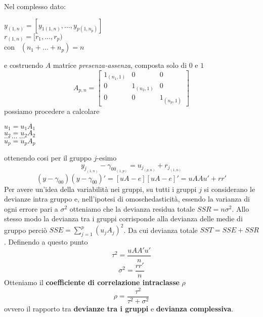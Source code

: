 \documentclass[a4page, 11pt]{article} %
\begin{document}
Nel complesso dato:
\begin{center}
$y_{(1,n)} = [y_{1(1,n)},\dots,y_{p(1,n_p)}]$ \\
$r_{(1,n)}=[r_1,\dots,r_p)$ \\
con \  $(n_1+\dots+n_p) = n$
\end{center}
e costruendo $A$ matrice \textit{presenza-assenza}, composta solo di $0$ e $1$
\[A_{p,n}=
\begin{bmatrix}
1_{(n_{1},1)} & 0&0 \\
0&1_{(n_{2},1)}&0 \\
0&0&1_{(n_{p},1)}
\end{bmatrix}
\]
possiamo procedere a calcolare
\begin{center}
$u_1= u_1 A_1$ \\
$u_2 = u_2 A_2$ \\
$\dots \ \dots \ \dots$ \\
$u_p = u_p A_p$
\end{center}
ottenendo cosi per il gruppo $j$-esimo
\begin{equation*}
y_{j_{(1,n)}} -\gamma_{00_{(1,p)}} = u_{j_{(p,n)}} + r_{j_{(1,n)}}
\end{equation*}
\begin{equation*}
(y-\gamma_{00})(y-\gamma_{00})' = [uA-e][uA-e]' = uAAu'+rr'
\end{equation*}
Per avere un'idea della variabilità nei gruppi, su tutti i gruppi $j$ si considerano le devianze intra gruppo e, nell'ipotesi di omoschedasticità, essendo la varianza di ogni errore pari a $\sigma^2$ otteniamo che la devianza residua totale $SSR = n\sigma^2$.
\newline
\newline
Allo stesso modo la devianza tra i gruppi corrisponde alla devianza delle medie di gruppo perciò $SSE = \sum^p_{j=1} (u_j A_j)^2$.
\newline
\newline
Da cui devianza totale $SST = SSE + SSR$.
\newline
\newline
Definendo a questo punto
\begin{equation*}
\tau^2 = \frac{uAA'u'}{n}
\end{equation*}
\begin{equation*}
\sigma^2 = \frac{rr'}{n}
\end{equation*}
Otteniamo il \textbf{coefficiente di correlazione intraclasse} $\rho$
\begin{equation*}
\rho = \frac{\tau^2}{\tau^2 + \sigma^2}
\end{equation*}
ovvero il rapporto tra \textbf{devianze tra i gruppi} e \textbf{devianza complessiva}.
\end{document}
